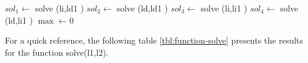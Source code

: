 \documentclass{llncs}
\begin{document}
\begin{algorithm}
{{}
}
$sol_1 \leftarrow $ solve (li,ld1 )\;
$sol_2 \leftarrow $ solve (ld,ld1 )\;
$sol_3 \leftarrow $ solve (li,li1 )\;
$sol_4 \leftarrow $ solve (ld,li1 )\;
$\max \gets 0$\;
{
}
\KwRet{$\max$\;}
\end{algorithm}

For a quick reference, the following table \ref{tbl:function-solve} presents the results for the function solve(l1,l2).

\end{document}
